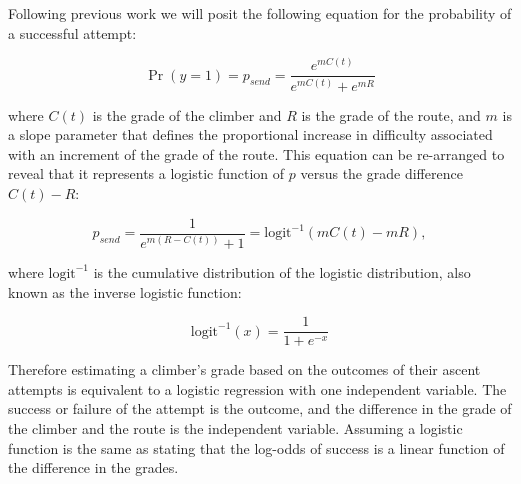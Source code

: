 \documentclass{article}
\begin{document}
{Following previous work \cite{scarff2020estimation} we will posit the following equation for the probability of a successful attempt:

\begin{equation}
\Pr(y = 1) = p_{send} = \frac{e^{mC(t)}}{e^{mC(t)} + e^{mR}}
\end{equation}

where $C(t)$ is the grade of the climber and $R$ is the grade of the route, and $m$ is a slope parameter that defines the proportional increase in difficulty associated with an increment of the grade of the route. This equation can be re-arranged to reveal that it represents a logistic function of $p$ versus the grade difference $C(t)-R$:

\begin{equation}
p_{send} = \frac{1}{e^{m(R-C(t))} + 1} = \textrm{logit}^{-1}(mC(t)-mR),
\label{logisticp}
\end{equation}

where $\textrm{logit}^{-1}$ is the cumulative distribution of the logistic distribution, also known as the inverse logistic function:

\begin{equation}
\textrm{logit}^{-1}(x) = \frac{1}{1 + e^{-x}}
\end{equation}

Therefore estimating a climber's grade based on the outcomes of their ascent attempts is equivalent to a logistic regression with one independent variable. The success or failure of the attempt is the outcome, and the difference in the grade of the climber and the route is the independent variable. Assuming a logistic function is the same as stating that the log-odds of success is a linear function of the difference in the grades.

            


}
\end{document}
